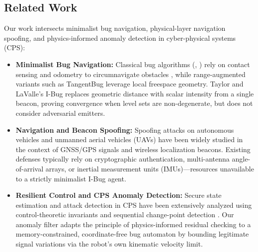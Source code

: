 \documentclass[12pt, a4paper]{article}
\begin{document}
\subsection{Related Work}
Our work intersects minimalist bug navigation, physical-layer navigation spoofing, and physics-informed anomaly detection in cyber-physical systems (CPS):
\begin{itemize}
    \item \textbf{Minimalist Bug Navigation:} Classical bug algorithms (, ) rely on contact sensing and odometry to circumnavigate obstacles \cite{lumelsky1987path}, while range-augmented variants such as TangentBug \cite{kamon1998tangentbug} leverage local freespace geometry. Taylor and LaValle's I-Bug \cite{taylor2009ibug, taylor2014intensity} replaces geometric distance with scalar intensity from a single beacon, proving convergence when level sets are non-degenerate, but does not consider adversarial emitters.
    \item \textbf{Navigation and Beacon Spoofing:} Spoofing attacks on autonomous vehicles and unmanned aerial vehicles (UAVs) have been widely studied in the context of GNSS/GPS signals \cite{kerns2014unmanned, psiaki2016gnss} and wireless localization beacons. Existing defenses typically rely on cryptographic authentication, multi-antenna angle-of-arrival arrays, or inertial measurement units (IMUs)—resources unavailable to a strictly minimalist I-Bug agent.
    \item \textbf{Resilient Control and CPS Anomaly Detection:} Secure state estimation and attack detection in CPS have been extensively analyzed using control-theoretic invariants \cite{pasqualetti2013attack, fawzi2014secure, giraldo2018survey} and sequential change-point detection \cite{basseville1993detection}. Our anomaly filter adapts the principle of physics-informed residual checking \cite{giraldo2018survey} to a memory-constrained, coordinate-free bug automaton by bounding legitimate signal variations via the robot's own kinematic velocity limit.
\end{itemize}
\end{document}
